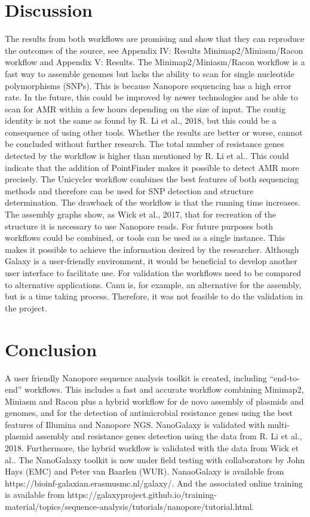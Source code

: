 \documentclass[a4paper,num-refs]{oup-contemporary}
\begin{document}
\section{Discussion}
The results from both workflows are promising and show that they can reproduce the outcomes of the source, see Appendix IV: Results Minimap2/Miniasm/Racon workflow and Appendix V: Results. The Minimap2/Miniasm/Racon workflow is a fast way to assemble genomes but lacks the ability to
scan for single nucleotide polymorphisms (SNPs). This is because Nanopore sequencing has a high error rate. In the future, this could be improved by newer technologies and be able to scan for AMR within a few hours depending on the size of input. The contig identity is not the same as found by R.
Li et al., 2018, but this could be a consequence of using other tools. Whether the results are better or worse, cannot be concluded without further research. The total number of resistance genes detected by the workflow is higher than mentioned by R. Li et al.. This could indicate that the addition of PointFinder makes it possible to detect AMR more precisely. The Unicycler workflow combines the best features of both sequencing methods and therefore can be used for SNP detection and structure determination. The drawback of the workflow is that the running time
increases. The assembly graphs show, as Wick et al., 2017, that for recreation of the structure it is necessary to use Nanopore reads. For future purposes both workflows could be combined, or tools can be used as a single instance. This makes it possible to achieve the information desired by the researcher. Although Galaxy is a user-friendly environment, it would be beneficial to develop another user interface to facilitate use. For validation the workflows need to be compared to alternative applications. Canu is, for example, an alternative for the assembly, but is a time taking
process. Therefore, it was not feasible to do the validation in the project.

\section{Conclusion}

A user friendly Nanopore sequence analysis toolkit is created, including “end-to-end” workflows. This includes a fast and accurate workflow combining Minimap2, Miniasm and Racon plus a hybrid workflow for de novo assembly of plasmids and genomes, and for the detection of antimicrobial resistance genes using the best features of Illumina and Nanopore NGS. NanoGalaxy is validated with multi-plasmid assembly and resistance genes detection using the data from R. Li et al., 2018. Furthermore, the hybrid workflow is validated with the data from Wick et al.. The NanoGalaxy toolkit is now under field testing with collaborators by John Hays (EMC) and Peter van Baarlen (WUR). NanaoGalaxy is available from https://bioinf-galaxian.erasmusmc.nl/galaxy/. And the associated online training is available from https://galaxyproject.github.io/training-material/topics/sequence-analysis/tutorials/nanopore/tutorial.html.
\end{document}
